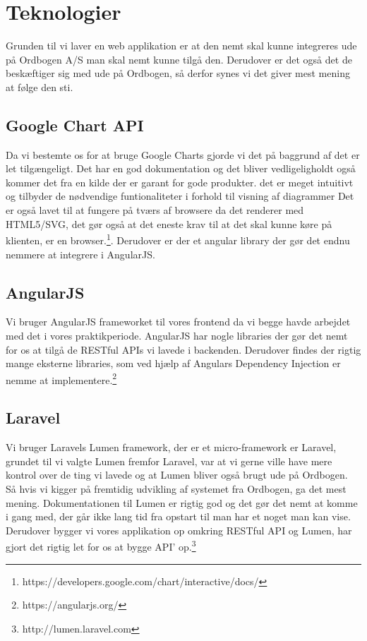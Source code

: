 \section{Teknologier}
Grunden til vi laver en web applikation er at den nemt skal kunne integreres ude på Ordbogen A/S man skal nemt kunne tilgå den.
Derudover er det også det de beskæftiger sig med ude på Ordbogen, så derfor synes vi det giver mest mening at følge den sti.
\hypertarget{GoogleChartAPI}{}
\subsection{Google Chart API}
Da vi bestemte os for at bruge Google Charts gjorde vi det på baggrund af det er let tilgængeligt.
Det har en god dokumentation og det bliver vedligeligholdt også kommer det fra en kilde der er garant for gode produkter.
det er meget intuitivt og tilbyder de nødvendige funtionaliteter i forhold til visning af diagrammer 
Det er også lavet til at fungere på tværs af browsere da det renderer med HTML5/SVG, 
det gør også at det eneste krav til at det skal kunne køre på klienten, er en browser.\footnote{https://developers.google.com/chart/interactive/docs/}. 
Derudover er der et angular library der gør det endnu nemmere at integrere i AngularJS.
\hypertarget{AngularJS}{}
\subsection{AngularJS}
Vi bruger AngularJS frameworket til vores frontend da vi begge havde arbejdet med det
i vores praktikperiode. AngularJS har nogle libraries der gør det nemt for os at tilgå de RESTful APIs
vi lavede i backenden. 
Derudover findes der rigtig mange eksterne libraries, som ved hjælp af Angulars Dependency Injection er nemme at implementere.\footnote{https://angularjs.org/}
\hypertarget{Laravel}{}
\subsection{Laravel}
\label{Laravel}
Vi bruger Laravels Lumen framework, der er et micro-framework er Laravel, grundet til vi valgte Lumen
fremfor Laravel, var at vi gerne ville have mere kontrol over de ting vi lavede og at Lumen bliver også brugt ude på Ordbogen.
Så hvis vi kigger på fremtidig udvikling af systemet fra Ordbogen, ga det mest mening.
Dokumentationen til Lumen er rigtig god og det gør det nemt at komme i gang med, der går ikke lang tid fra opstart
til man har et noget man kan vise. 
Derudover bygger vi vores applikation op omkring RESTful API og Lumen, har gjort det rigtig let for os at bygge 
API' op.\footnote{http://lumen.laravel.com}
